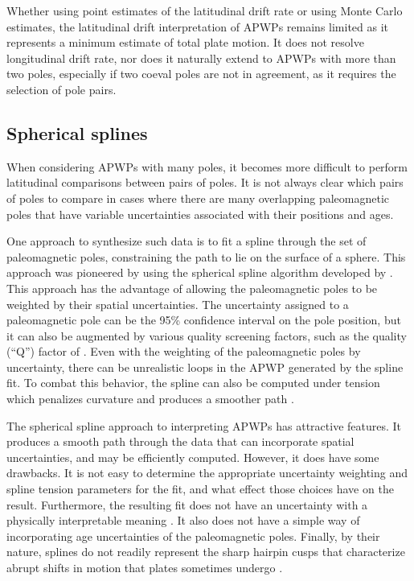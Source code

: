 \documentclass[]{agujournal2019}
\begin{document}
Whether using point estimates of the latitudinal drift rate or using Monte Carlo estimates, the latitudinal drift interpretation of APWPs remains limited as it represents a minimum estimate of total plate motion. It does not resolve longitudinal drift rate, nor does it naturally extend to APWPs with more than two poles, especially if two coeval poles are not in agreement, as it requires the selection of pole pairs.

\subsection*{Spherical splines}
When considering APWPs with many poles, it becomes more difficult to perform latitudinal comparisons between pairs of poles. It is not always clear which pairs of poles to compare in cases where there are many overlapping paleomagnetic poles that have variable uncertainties associated with their positions and ages.

One approach to synthesize such data is to fit a spline through the set of paleomagnetic poles, constraining the path to lie on the surface of a sphere. This approach was pioneered by  using the spherical spline algorithm developed by . This approach has the advantage of allowing the paleomagnetic poles to be weighted by their spatial uncertainties. The uncertainty assigned to a paleomagnetic pole can be the 95\% confidence interval on the pole position, but it can also be augmented by various quality screening factors, such as the quality (``Q'') factor of  \cite{Torsvik1992a}. Even with the weighting of the paleomagnetic poles by uncertainty, there can be unrealistic loops in the APWP generated by the spline fit. To combat this behavior, the spline can also be computed under tension which penalizes curvature and produces a smoother path \cite{Torsvik1996a}.

The spherical spline approach to interpreting APWPs has attractive features. It produces a smooth path through the data that can incorporate spatial uncertainties, and may be efficiently computed. However, it does have some drawbacks. It is not easy to determine the appropriate uncertainty weighting and spline tension parameters for the fit, and what effect those choices have on the result. Furthermore, the resulting fit does not have an uncertainty with a physically interpretable meaning \cite{Torsvik1996a}. It also does not have a simple way of incorporating age uncertainties of the paleomagnetic poles. Finally, by their nature, splines do not readily represent the sharp hairpin cusps that characterize abrupt shifts in motion that plates sometimes undergo \cite{Irving1972a, Gordon1984a, Torsvik2012a}.
\end{document}
